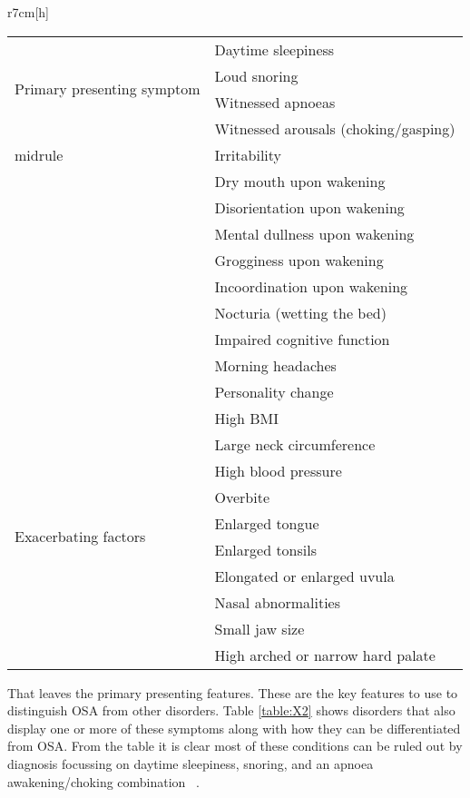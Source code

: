\begin{wraptable}{r}{7cm}[h]
\centering
\begin{tabular}{l l}
\toprule
\multirow{4}{*}{Primary presenting symptom}&Daytime sleepiness\\ 
&Loud snoring\\ 
&Witnessed apnoeas\\ 
&Witnessed arousals (choking/gasping)\\ midrule
\multirow{10}{*}{Secondary symptoms}&Irritability\\ 
&Dry mouth upon wakening\\ 
&Disorientation upon wakening\\ 
&Mental dullness upon wakening\\ 
&Grogginess upon wakening\\ 
&Incoordination upon wakening\\ 
&Nocturia (wetting the bed)\\ 
&Impaired cognitive function\\ 
&Morning headaches\\ 
&Personality change\\ \midrule
\multirow{10}{*}{Exacerbating factors}&High BMI\\ 
&Large neck circumference\\ 
&High blood pressure\\ 
&Overbite\\ 
&Enlarged tongue\\ 
&Enlarged tonsils\\ 
&Elongated or enlarged uvula\\ 
&Nasal abnormalities\\ 
&Small jaw size\\ 
&High arched or narrow hard palate\\ \bottomrule
\end{tabular}
\caption{Symptoms and exacerbating factors of OSA.}
\label{table:X4}
\end{wraptable}

That leaves the primary presenting features. These are the key features to use to distinguish OSA from other disorders. Table \ref{table:X2} shows disorders that also display one or more of these symptoms along with how they can be differentiated from OSA. From the table it is clear most of these conditions can be ruled out by diagnosis focussing on daytime sleepiness, snoring, and an apnoea awakening/choking combination ~\cite{american2001international}.

